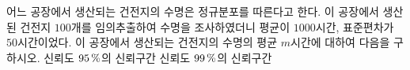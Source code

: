 어느 공장에서 생산되는 건전지의 수명은 정규분포를 따른다고 한다. 이 공장에서 생산된 건전지 $100$개를 임의추출하여 수명을 조사하였더니 평균이 $1000$시간, 표준편차가 $50$시간이었다. 이 공장에서 생산되는 건전지의 수명의 평균 $m$시간에 대하여 다음을 구하시오. 
 신뢰도 $95\mkern3mu \%$의 신뢰구간
 신뢰도 $99\mkern3mu \%$의 신뢰구간
